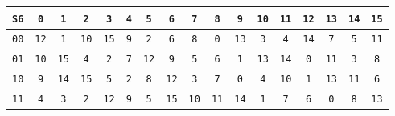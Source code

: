 \documentclass{article}
\begin{document}
\begin{center}
\vspace{10pt}
\begin{tabular}{|c|cccccccccccccccc|}
  \hline
\texttt{S6} & \texttt{0} & \texttt{1} & \texttt{2} & \texttt{3} & \texttt{4} & \texttt{5} & \texttt{6} & \texttt{7} & \texttt{8} & \texttt{9} & \texttt{10} & \texttt{11} & \texttt{12} & \texttt{13} & \texttt{14} & \texttt{15} \\
\hline
\texttt{0}\texttt{0} & \texttt{1}\texttt{2} & \texttt{1} & \texttt{1}\texttt{0} & \texttt{1}\texttt{5} & \texttt{9} & \texttt{2} & \texttt{6} & \texttt{8} & \texttt{0} & \texttt{1}\texttt{3} & \texttt{3} & \texttt{4} & \texttt{1}\texttt{4} & \texttt{7} & \texttt{5} & \texttt{1}\texttt{1} \\
\texttt{0}\texttt{1} & \texttt{1}\texttt{0} & \texttt{1}\texttt{5} & \texttt{4} & \texttt{2} & \texttt{7} & \texttt{1}\texttt{2} & \texttt{9} & \texttt{5} & \texttt{6} & \texttt{1} & \texttt{1}\texttt{3} & \texttt{1}\texttt{4} & \texttt{0} & \texttt{1}\texttt{1} & \texttt{3} & \texttt{8} \\
\texttt{1}\texttt{0} & \texttt{9} & \texttt{1}\texttt{4} & \texttt{1}\texttt{5} & \texttt{5} & \texttt{2} & \texttt{8} & \texttt{1}\texttt{2} & \texttt{3} & \texttt{7} & \texttt{0} & \texttt{4} & \texttt{1}\texttt{0} & \texttt{1} & \texttt{1}\texttt{3} & \texttt{1}\texttt{1} & \texttt{6} \\
\texttt{1}\texttt{1} & \texttt{4} & \texttt{3} & \texttt{2} & \texttt{1}\texttt{2} & \texttt{9} & \texttt{5} & \texttt{1}\texttt{5} & \texttt{1}\texttt{0} & \texttt{1}\texttt{1} & \texttt{1}\texttt{4} & \texttt{1} & \texttt{7} & \texttt{6} & \texttt{0} & \texttt{8} & \texttt{1}\texttt{3} \\
\hline
\end{tabular}


\end{center}
\end{document}

